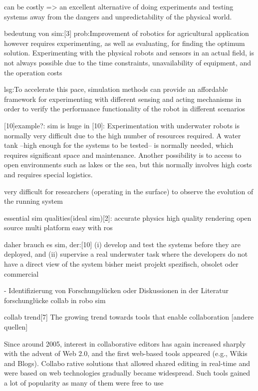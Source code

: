 \documentclass[german,version-2020-11]{uzl-thesis}
\begin{document}
      can be costly => an excellent alternative of doing experiments and testing systems away from the dangers and unpredictability of the physical world.
	
      bedeutung von sim:[3]
      prob:Improvement of robotics for agricultural application however requires experimenting, as well as evaluating, for finding the optimum solution. Experimenting with the physical robots and sensors in an actual field, is not always possible due to the time constraints, unavailability of equipment, and the operation costs
      
      lsg:To accelerate this pace, simulation methods can provide an affordable framework for experimenting with different sensing and acting mechanisms in order to verify the performance functionality of the robot in different scenarios
  

	[10]example?: sim is huge in [10]:
        Experimentation with underwater robots is normally very difficult due to the high number of resources required.
          A water tank –high enough for the systems to be tested– is normally needed, 
            which requires significant space and maintenance. 
          Another possibility is to access to open environments such as lakes or the sea, but this normally involves high costs and requires special logistics. 
          
          very difficult for researchers (operating in the surface) to observe the evolution of the running system



essential sim qualities(ideal sim)[2]:
	accurate physics
	high quality rendering
	open source
	multi platform
	easy with ros


  daher brauch es sim, der:[10]
  (i) develop and test the systems before they are deployed, and 
  (ii) supervise a real underwater task where the developers do not have a direct view of the system
bisher meist  projekt spezifisch, obsolet oder commercial








- Identifizierung von Forschungslücken oder Diskussionen in der Literatur   
forschunglücke collab in robo sim

collab trend[7]
    The growing trend towards tools that enable collaboration [andere quellen]
    
    Since around 2005, interest in collaborative editors has again increased sharply with the advent of Web 2.0, and the first web-based tools appeared (e.g., Wikis and Blogs). Collaborative solutions that allowed shared editing in real-time and were based on web technologies gradually became widespread. Such tools gained a lot of popularity as many of them were free to use
    
\end{document}
